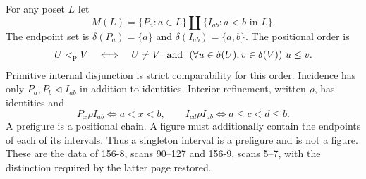 \begin{definition}\label{SA21-A05}
For any poset $L$ let
\[
 M(L)=\{P_a:a\in L\}\amalg\{I_{ab}:a<b\text{ in }L\}.
\]
The endpoint set is $\delta(P_a)=\{a\}$ and
$\delta(I_{ab})=\{a,b\}$. The positional order is
\[
 U<_{\rm p}V\quad\Longleftrightarrow\quad
 U\ne V\ \text{ and }\ (\forall u\in\delta(U),v\in\delta(V))\ u\leq v.
\]
Primitive internal disjunction is strict comparability for this order.
Incidence has only $P_a,P_b\lhd I_{ab}$ in addition to identities.
Interior refinement, written $\rho$, has identities and
\[
 P_x\rho I_{ab}\iff a<x<b,\qquad
 I_{cd}\rho I_{ab}\iff a\leq c<d\leq b.
\]
A prefigure is a positional chain. A figure must additionally contain
the endpoints of each of its intervals. Thus a singleton interval is
a prefigure and is not a figure. These are the data of 156-8,
scans 90--127 and 156-9, scans 5--7, with the distinction required by
the latter page restored.
\end{definition}



